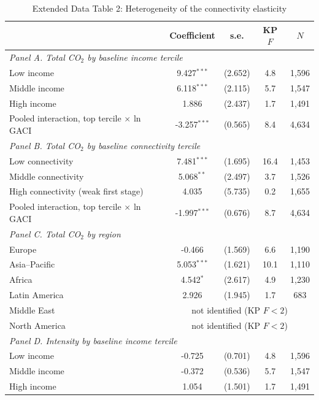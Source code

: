 \begin{table}[htbp]
\centering
\begin{threeparttable}
\caption{Extended Data Table 2: Heterogeneity of the connectivity elasticity}
\label{tab:hetero}
\footnotesize
\begin{tabular}{lcccc}
\toprule
 & Coefficient & s.e. & KP $F$ & $N$ \\
\midrule
\multicolumn{5}{l}{\textit{Panel A. Total CO$_2$ by baseline income tercile}} \\
  Low income & 9.427$^{***}$ & (2.652) & 4.8 & 1,596 \\
  Middle income & 6.118$^{***}$ & (2.115) & 5.7 & 1,547 \\
  High income & 1.886 & (2.437) & 1.7 & 1,491 \\
  \quad Pooled interaction, top tercile $\times$ ln GACI & -3.257$^{***}$ & (0.565) & 8.4 & 4,634 \\
\midrule
\multicolumn{5}{l}{\textit{Panel B. Total CO$_2$ by baseline connectivity tercile}} \\
  Low connectivity & 7.481$^{***}$ & (1.695) & 16.4 & 1,453 \\
  Middle connectivity & 5.068$^{**}$ & (2.497) & 3.7 & 1,526 \\
  High connectivity (weak first stage) & 4.035 & (5.735) & 0.2 & 1,655 \\
  \quad Pooled interaction, top tercile $\times$ ln GACI & -1.997$^{***}$ & (0.676) & 8.7 & 4,634 \\
\midrule
\multicolumn{5}{l}{\textit{Panel C. Total CO$_2$ by region}} \\
  Europe & -0.466 & (1.569) & 6.6 & 1,190 \\
  Asia--Pacific & 5.053$^{***}$ & (1.621) & 10.1 & 1,110 \\
  Africa & 4.542$^{*}$ & (2.617) & 4.9 & 1,230 \\
  Latin America & 2.926 & (1.945) & 1.7 & 683 \\
  Middle East & \multicolumn{4}{c}{not identified (KP $F<2$)} \\
  North America & \multicolumn{4}{c}{not identified (KP $F<2$)} \\
\midrule
\multicolumn{5}{l}{\textit{Panel D. Intensity by baseline income tercile}} \\
  Low income & -0.725 & (0.701) & 4.8 & 1,596 \\
  Middle income & -0.372 & (0.536) & 5.7 & 1,547 \\
  High income & 1.054 & (1.501) & 1.7 & 1,491 \\

\end{tabular}
\end{threeparttable}
\end{table}
